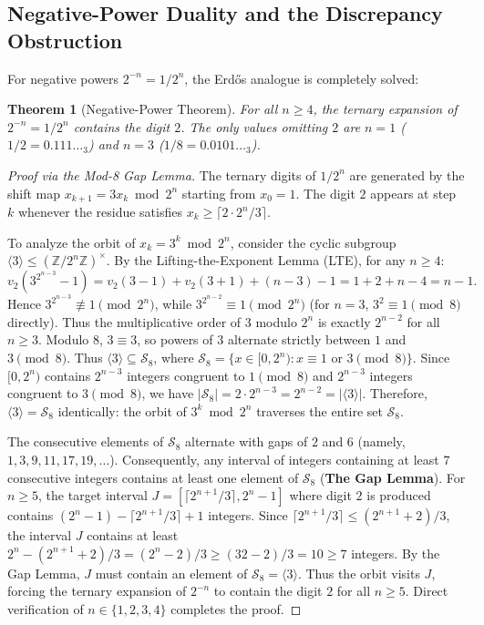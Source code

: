 \documentclass[11pt,reqno]{amsart}
\theoremstyle{plain}
\newtheorem{theorem}{Theorem}[section]
\theoremstyle{definition}
\theoremstyle{remark}
\newcommand{\Z}{\mathbb{Z}}
\begin{document}
\subsection{Negative-Power Duality and the Discrepancy Obstruction}
For negative powers $2^{-n} = 1/2^n$, the Erd\H{o}s analogue is completely solved:
\begin{theorem}[Negative-Power Theorem]\label{thm:neg_power}
For all $n \ge 4$, the ternary expansion of $2^{-n} = 1/2^n$ contains the digit $2$. The only values omitting $2$ are $n = 1$ ($1/2 = 0.111\dots_3$) and $n = 3$ ($1/8 = 0.0101\dots_3$).
\end{theorem}

\begin{proof}[Proof via the Mod-8 Gap Lemma]
The ternary digits of $1/2^n$ are generated by the shift map $x_{k+1} = 3 x_k \bmod 2^n$ starting from $x_0 = 1$. The digit $2$ appears at step $k$ whenever the residue satisfies $x_k \ge \lceil 2 \cdot 2^n / 3 \rceil$. 

To analyze the orbit of $x_k = 3^k \bmod 2^n$, consider the cyclic subgroup $\langle 3 \rangle \le (\Z / 2^n \Z)^\times$. By the Lifting-the-Exponent Lemma (LTE), for any $n \ge 4$:
\begin{equation}
v_2(3^{2^{n-3}} - 1) = v_2(3 - 1) + v_2(3 + 1) + (n - 3) - 1 = 1 + 2 + n - 4 = n - 1.
\end{equation}
Hence $3^{2^{n-3}} \not\equiv 1 \pmod{2^n}$, while $3^{2^{n-2}} \equiv 1 \pmod{2^n}$ (for $n = 3$, $3^2 \equiv 1 \pmod 8$ directly). Thus the multiplicative order of $3$ modulo $2^n$ is exactly $2^{n-2}$ for all $n \ge 3$. Modulo $8$, $3 \equiv 3$, so powers of $3$ alternate strictly between $1$ and $3 \pmod 8$. Thus $\langle 3 \rangle \subseteq \mathcal{S}_8$, where $\mathcal{S}_8 = \{ x \in [0, 2^n) : x \equiv 1 \text{ or } 3 \pmod 8 \}$. Since $[0, 2^n)$ contains $2^{n-3}$ integers congruent to $1 \pmod 8$ and $2^{n-3}$ integers congruent to $3 \pmod 8$, we have $|\mathcal{S}_8| = 2 \cdot 2^{n-3} = 2^{n-2} = |\langle 3 \rangle|$. Therefore, $\langle 3 \rangle = \mathcal{S}_8$ identically: the orbit of $3^k \bmod 2^n$ traverses the entire set $\mathcal{S}_8$.

The consecutive elements of $\mathcal{S}_8$ alternate with gaps of $2$ and $6$
(namely, $1, 3, 9, 11, 17, 19, \dots$). Consequently, any interval of integers containing at least $7$ consecutive integers contains at least one element of $\mathcal{S}_8$ (\textbf{The Gap Lemma}). For $n \ge 5$, the target interval $J = [\lceil 2^{n+1} / 3 \rceil, 2^n - 1]$ where digit $2$ is produced contains $(2^n - 1) - \lceil 2^{n+1}/3 \rceil + 1$ integers. Since $\lceil 2^{n+1}/3 \rceil \le (2^{n+1} + 2)/3$, the interval $J$ contains at least $2^n - (2^{n+1}+2)/3 = (2^n - 2)/3 \ge (32 - 2)/3 = 10 \ge 7$ integers. By the Gap Lemma, $J$ must contain an element of $\mathcal{S}_8 = \langle 3 \rangle$. Thus the orbit visits $J$, forcing the ternary expansion of $2^{-n}$ to contain the digit $2$ for all $n \ge 5$. Direct verification of $n \in \{1, 2, 3, 4\}$ completes the proof.
\end{proof}
\end{document}
